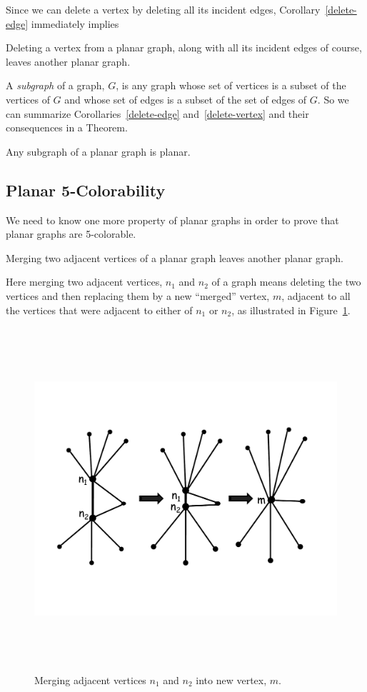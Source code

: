 Since we can delete a vertex by deleting all its incident edges,
Corollary~\ref{delete-edge} immediately implies

\begin{corollary}\label{delete-vertex}
Deleting a vertex from a planar graph, along with all its incident
edges of course, leaves another planar graph.
\end{corollary}

A \emph{subgraph} of a graph, $G$, is any graph whose set of vertices is a
subset of the vertices of $G$ and whose set of edges is a subset of the
set of edges of $G$.  So we can summarize Corollaries~\ref{delete-edge}
and~\ref{delete-vertex} and their consequences in a Theorem.

\begin{theorem}\label{planar-subgraph}
  Any subgraph of a planar graph is planar.
\end{theorem}

\subsection{Planar 5-Colorability}

We need to know one more property of planar graphs in order to prove that
planar graphs are 5-colorable.

\begin{lemma}\label{mergelem}
Merging two adjacent vertices of a planar graph leaves another planar graph.
\end{lemma}

Here merging two adjacent vertices, $n_1$ and $n_2$ of a graph means
deleting the two vertices and then replacing them by a new ``merged''
vertex, $m$, adjacent to all the vertices that were adjacent to either of
$n_1$ or $n_2$, as illustrated in Figure~\ref{fig:merged}.

\begin{figure}[h]
\centering \includegraphics[height=5in]{figures/vertex-merge-arrows.pdf}
\caption{Merging adjacent vertices $n_1$ and $n_2$ into new vertex, $m$.}
\label{fig:merged}
\end{figure}

